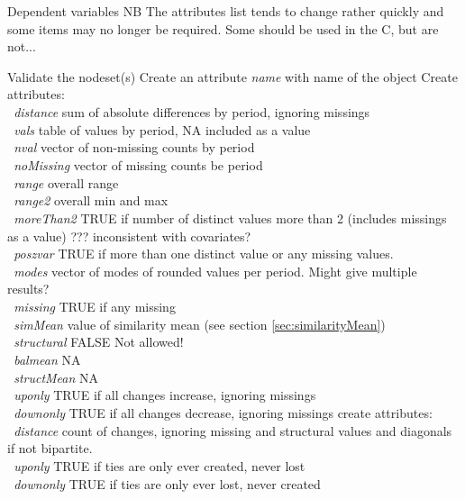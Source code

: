 \documentclass[12pt,a4paper]{article}
\makeatletter
\renewcommand{\=}{\,=\,}
\newcommand{\+}{\,+\,}
\newcommand{\nnm}[1]{\textsf{\textit{#1}}}
\renewcommand{\subsection}{\@startsection{subsection}{2}
                {0pt}{0.7\baselineskip}{0.3\baselineskip}
                {\sffamily} }
\newcommand{\sfn}[1]{\textbf{\texttt{#1}}}
\makeatother
\begin{document}
\subsection{Dependent variables}
\label{sec:dependent}
NB The attributes list tends to change rather quickly and some items may no
longer be required. Some should be used in the C, but are not...
\begin{algorithmic}
\STATE Validate the nodeset(s)
\STATE Create an attribute \nnm{name} with name of the object
\STATE Create attributes:\\
\sfn{ }\nnm{distance} sum of absolute differences by period, ignoring missings\\
\sfn{ }\nnm{vals} table of values by period, NA included as a value\\
\sfn{ }\nnm{nval} vector of non-missing counts by period\\
\sfn{ }\nnm{noMissing} vector of missing counts be period\\
\sfn{ }\nnm{range} overall range\\
\sfn{ }\nnm{range2} overall min and max\\
\sfn{ }\nnm{moreThan2} TRUE if number of distinct values more than 2 (includes
missings as a value) ??? inconsistent with covariates?\\
\sfn{ }\nnm{poszvar} TRUE if more than one distinct value or any missing
values.\\
\sfn{ }\nnm{modes} vector of modes of rounded values per period. Might give
multiple results?\\
\sfn{ }\nnm{missing} TRUE if any missing\\
\sfn{ }\nnm{simMean} value of similarity mean (see section
\ref{sec:similarityMean})\\
\sfn{ }\nnm{structural} FALSE Not allowed!\\
\sfn{ }\nnm{balmean} NA\\
\sfn{ }\nnm{structMean} NA\\
\sfn{ }\nnm{uponly} TRUE if all changes increase, ignoring missings\\
\sfn{ }\nnm{downonly} TRUE if all changes decrease, ignoring missings
\STATE create attributes:\\
\sfn{ }\nnm{distance} count of changes, ignoring missing and structural values
and diagonals if not bipartite.\\
\sfn{ }\nnm{uponly} TRUE if ties are only ever created, never lost\\
\sfn{ }\nnm{downonly} TRUE if ties are only ever lost, never created\\

\end{algorithmic}
\end{document}
